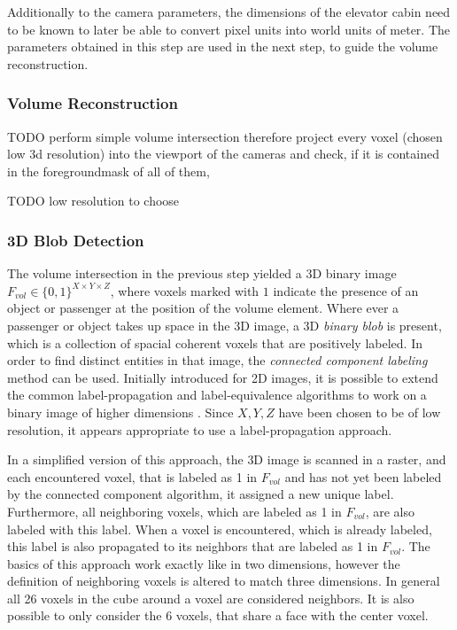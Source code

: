 Additionally to the camera parameters, the dimensions of the elevator cabin need to be known to later be able to convert pixel units into world units of meter.
The parameters obtained in this step are used in the next step, to guide the volume reconstruction.

\subsubsection{Volume Reconstruction}




TODO
perform simple volume intersection
therefore project every voxel (chosen low 3d resolution)
into the viewport of the cameras and check, if it is contained in the foregroundmask of all of them,

TODO low resolution to choose

\subsubsection{3D Blob Detection}

The volume intersection in the previous step yielded a \ac{3D} binary image \\
$ F_{vol} \in \{0, 1\}^{X \times Y \times Z}$, where voxels marked with $ 1 $ indicate the presence of an object or passenger at the position of the volume element.
Where ever a passenger or object takes up space in the \ac{3D} image, a \ac{3D} \emph{binary blob} is present, which is a collection of spacial coherent voxels that are positively labeled.
In order to find distinct entities in that image, the \emph{connected component labeling} method can be used.
Initially introduced for \ac{2D} images, it is possible to extend 
the common label-propagation and label-equivalence algorithms to work on a binary image of higher dimensions
\autocite[][p.~39]{he2017connected}.
Since $ X, Y, Z $ have been chosen to be of low resolution, it appears appropriate to use a label-propagation approach.

In a simplified version of this approach, the \ac{3D} image is scanned in a raster, 
and each encountered voxel, that is labeled as 1 in $ F_{vol} $ and has not yet been labeled by the connected component algorithm, it assigned a new unique label.
Furthermore, all neighboring voxels, which are labeled as 1 in $ F_{vol} $, are also labeled with this label.
When a voxel is encountered, which is already labeled, this label is also propagated to its neighbors that are labeled as 1 in $ F_{vol} $. 
The basics of this approach work exactly like in two dimensions, however the definition of neighboring voxels is altered to match three dimensions. 
In general all 26 voxels in the cube around a voxel are considered neighbors.
It is also possible to only consider the 6 voxels, that share a face with the center voxel.

